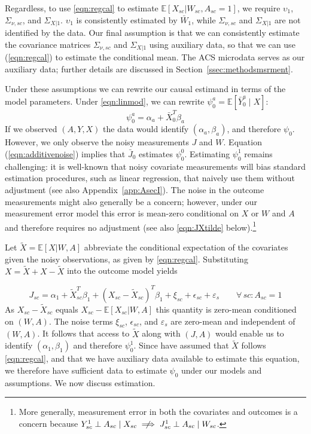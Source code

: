\documentclass[aoas]{imsart}
\theoremstyle{plain}
\theoremstyle{remark}
\begin{document}
Regardless, to use \eqref{eqn:regcal} to estimate $\mathbb{E}[X_{sc}|W_{sc}, A_{sc}=1]$, we require $\upsilon_1$, $\Sigma_{\nu,sc}$, and $\Sigma_{X|1}$. $\upsilon_1$ is consistently estimated by $\bar{W}_1$, while $\Sigma_{\nu,sc}$ and $\Sigma_{X|1}$ are not identified by the data. Our final assumption is that we can consistently estimate the covariance matrices $\Sigma_{\nu,sc}$ and $\Sigma_{X|1}$ using auxiliary data, so that we can use (\ref{eqn:regcal}) to estimate the conditional mean. The ACS microdata serves as our auxiliary data; further details are discussed in Section~\ref{ssec:methodsmsrment}.

Under these assumptions we can rewrite our causal estimand in terms of the model parameters. Under \eqref{eqn:linmod}, we can rewrite $\psi_0^a = \mathbb{E}[\bar{Y}_0^a \mid X]$:
\begin{equation}\label{eqn:outcome}
\psi_0^a = \alpha_a + \bar{X}_0^T\beta_a
\end{equation}
If we observed $(A, Y, X)$ the data would identify $(\alpha_a, \beta_a)$, and therefore $\psi_0$. However, we only observe the noisy measurements $J$ and $W$. Equation (\ref{eqn:additivenoise}) implies that $\bar{J}_0$ estimates $\psi_0^0$. Estimating $\psi_0^1$ remains challenging: it is well-known that noisy covariate measurements will bias standard estimation procedures, such as linear regression, that naively use them without adjustment (see also Appendix~\ref{app:AsecI}). The noise in the outcome measurements might also generally be a concern; however, under our measurement error model this error is mean-zero conditional on $X$ or $W$ and $A$ and therefore requires no adjustment (see also \eqref{eqn:JXtilde} below).\footnote{More generally, measurement error in both the covariates and outcomes is a concern because $Y_{sc}^1 \perp A_{sc} \mid X_{sc} \centernot\implies J_{sc}^1 \perp A_{sc} \mid W_{sc}$.} 

Let $\tilde{X} = \mathbb{E}[X |W, A]$ abbreviate the conditional expectation of the covariates given the noisy observations, as given by \eqref{eqn:regcal}. Substituting $X = \tilde{X} + X - \tilde{X}$ into the outcome model yields

\begin{equation} \label{eqn:JXtilde}
    J_{sc} = \alpha_1 + \tilde{X}_{sc}^T\beta_1 + (X_{sc} - \tilde{X}_{sc})^T\beta_1 + \xi_{sc} + \epsilon_{sc} + \varepsilon_s \qquad\forall\, sc: A_{sc} = 1
\end{equation}
As $X_{sc} - \tilde{X}_{sc}$ equals $X_{sc} - \mathbb{E}[X_{sc}|W,A]$ this quantity is zero-mean conditioned on $(W,A)$. The noise terms $\xi_{sc}$, $\epsilon_{sc}$, and $\varepsilon_s$ are zero-mean and independent of $(W, A)$. It follows that access to $\tilde{X}$ along with $(J,A)$ would enable us to identify $(\alpha_1, \beta_1)$ and therefore $\psi_0^1$. Since have assumed that $\tilde{X}$ follows \eqref{eqn:regcal}, and that we have auxiliary data available to estimate this equation, we therefore have sufficient data to estimate $\psi_0$ under our models and assumptions. We now discuss estimation.
\end{document}
